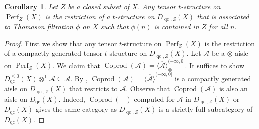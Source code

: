 \documentclass[11pt]{amsart}
\theoremstyle{plain}
\newtheorem{corollary}[theorem]{Corollary}
\theoremstyle{definition}
\numberwithin{equation}{section}
\numberwithin{theorem}{section}
\begin{document}
\begin{corollary}\label{cor:lifitng_tensor_structure_from_perfect_categories}
    Let $Z$ be a closed subset of $X$. Any tensor $t$-structure on $\operatorname{Perf}_Z (X)$ is the restriction of a $t$-structure on $D_{\operatorname{qc},Z}(X)$ that is associated to Thomason filtration $\phi$ on $X$ such that $\phi (n)$ is contained in $Z$ for all $n$.
\end{corollary}

\begin{proof}
    First we show that any tensor $t$-structure on $\operatorname{Perf}_Z (X)$ is the restriction of a compactly generated tensor $t$-structure on $D_{\operatorname{qc},Z}(X)$. Let $\mathcal{A}$ be a $\otimes$-aisle on $\operatorname{Perf}_Z (X)$. We claim that $\operatorname{Coprod}(\mathcal{A}) = \overline{ \langle \mathcal{A} \rangle}^{(-\infty,0]}_{\otimes}$. It suffices to show $D^{\leq 0}_{\operatorname{qc}}(X) \otimes^{\mathbf{L}} \mathcal{A} \subseteq \mathcal{A}$. By , $\operatorname{Coprod}(\mathcal{A}) = \overline{ \langle \mathcal{A} \rangle}^{(-\infty,0]}$ is a compactly generated aisle on $D_{\operatorname{qc},Z}(X)$ that restricts to $\mathcal{A}$. Observe that $\operatorname{Coprod}(\mathcal{A})$ is also an aisle on $D_{\operatorname{qc}}(X)$. Indeed, $\operatorname{Coprod}(-)$ computed for $\mathcal{A}$ in $D_{\operatorname{qc},Z}(X)$ or $D_{\operatorname{qc}}(X)$ gives the same category as $D_{\operatorname{qc},Z}(X)$ is a strictly full subcategory of $D_{\operatorname{qc}}(X)$.
    

\end{proof}
\end{document}
